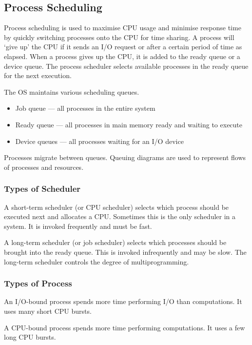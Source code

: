 \subsection{Process Scheduling}

Process scheduling is used to maximise CPU usage and minimise response time by quickly switching processes onto the CPU for time sharing.
A process will `give up' the CPU if it sends an I/O request or after a certain period of time as elapsed.
When a process gives up the CPU, it is added to the ready queue or a device queue.
The process scheduler selects available processes in the ready queue for the next execution.

The OS maintains various scheduling queues.
\begin{itemize}
  \item Job queue --- all processes in the entire system
  \item Ready queue --- all processes in main memory ready and waiting to execute
  \item Device queues --- all processes waiting for an I/O device
\end{itemize}

Processes migrate between queues.
Queuing diagrams are used to represent flows of processes and resources.

\subsubsection{Types of Scheduler}

A short-term scheduler (or CPU scheduler) selects which process should be executed next and allocates a CPU\@.
Sometimes this is the only scheduler in a system.
It is invoked frequently and must be fast.

A long-term scheduler (or job scheduler) selects which processes should be brought into the ready queue.
This is invoked infrequently and may be slow.
The long-term scheduler controls the degree of multiprogramming.

\subsubsection{Types of Process}

An I/O-bound process spends more time performing I/O than computations.
It uses many short CPU bursts.

A CPU-bound process spends more time performing computations.
It uses a few long CPU bursts.


